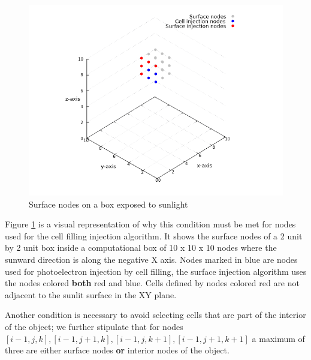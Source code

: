 \begin{figure}[h!]
    \centering
    \includegraphics[scale=0.6]{figures/nodes.png}
    \caption{Surface nodes on a box exposed to sunlight}
    \label{fig:sunlitNodes}
\end{figure}

Figure \ref{fig:sunlitNodes} is a visual representation of why this condition must be met for nodes used for the cell filling injection algorithm. It shows the surface nodes of a 2 unit by 2 unit box inside a computational box of 10 x 10 x 10 nodes where the sunward direction is along the negative X axis. Nodes marked in blue are nodes used for photoelectron injection by cell filling, the surface injection algorithm uses the nodes colored \textbf{both} red and blue. Cells defined by nodes colored red are not adjacent to the sunlit surface in the XY plane.

Another condition is necessary to avoid selecting cells that are part of the interior of the object; we further stipulate that for nodes $[i-1,j,k], [i-1,j+1,k], [i-1,j,k+1], [i-1,j+1,k+1]$ a maximum of three are either surface nodes \textbf{or} interior nodes of the object.



